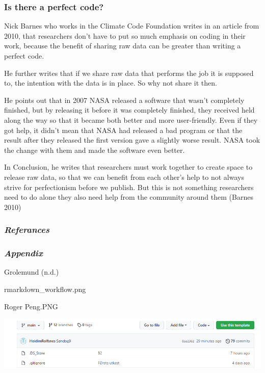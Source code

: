 \documentclass[
]{article}
\begin{document}
\hypertarget{is-there-a-perfect-code}{%
\subsubsection{Is there a perfect code?}\label{is-there-a-perfect-code}}

Nick Barnes who works in the Climate Code Foundation writes in an
article from 2010, that researchers don't have to put so much emphasis
on coding in their work, because the benefit of sharing raw data can be
greater than writing a perfect code.

He further writes that if we share raw data that performs the job it is
supposed to, the intention with the data is in place. So why not share
it then.

He points out that in 2007 NASA released a software that wasn't
completely finished, but by releasing it before it was completely
finished, they received held along the way so that it became both better
and more user-friendly. Even if they got help, it didn't mean that NASA
had released a bad program or that the result after they released the
first version gave a slightly worse result. NASA took the change with
them and made the software even better.

In Conclusion, he writes that researchers must work together to create
space to release raw data, so that we can benefit from each other's help
to not always strive for perfectionism before we publish. But this is
not something researchers need to do alone they also need help from the
community around them (Barnes 2010)

\hypertarget{referances}{%
\subsubsection{\texorpdfstring{\emph{Referances}}{Referances}}\label{referances}}

\hypertarget{appendix}{%
\subsubsection{\texorpdfstring{\emph{Appendix}}{Appendix}}\label{appendix}}

Grolemund (n.d.)

rmarkdown\_workflow.png

Roger Peng.PNG

\includegraphics{Skjermbilde av git history.PNG}
\end{document}
